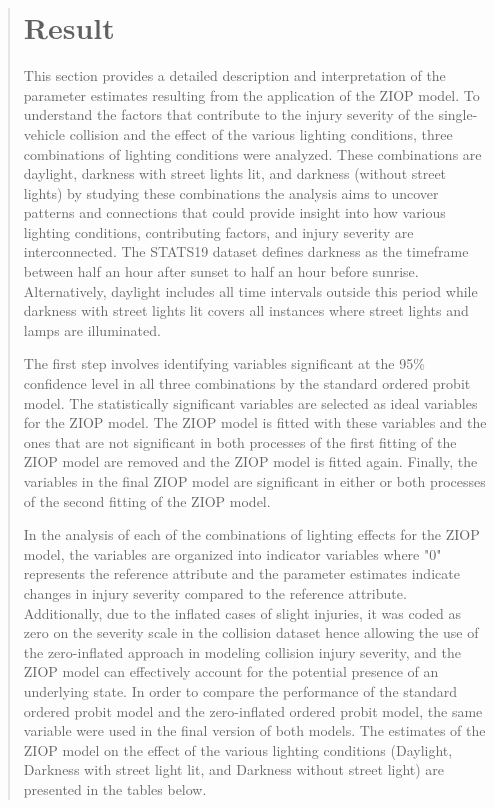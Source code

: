\documentclass[12]{report}
\begin{document}
\begin{quote}
{\large
\chapter{Result}

This section provides a detailed description and interpretation of the parameter estimates resulting from the application of the ZIOP model. To understand the factors that contribute to the injury severity of the single-vehicle collision and the effect of the various lighting conditions, three combinations of lighting conditions were analyzed. These combinations are daylight, darkness with street lights lit, and darkness (without street lights) by studying these combinations the analysis aims to uncover patterns and connections that could provide insight into how various lighting conditions, contributing factors, and injury severity are interconnected.  The STATS19 dataset defines darkness as the timeframe between  half an hour after sunset to half an hour before sunrise. Alternatively, daylight includes all time intervals outside this period while darkness with street lights lit covers all instances where street lights and lamps are illuminated.

The first step involves identifying variables significant at the 95\% confidence level in all three combinations by the standard ordered probit model. The statistically significant variables are selected as ideal variables for the ZIOP model. The ZIOP model is fitted with these variables and the ones that are not significant in both processes of the first fitting of the ZIOP model are removed and the ZIOP model is fitted again. Finally, the variables in the final ZIOP model are significant in either or both processes of the second fitting of the ZIOP model.

In the analysis of each of the combinations of lighting effects for the ZIOP model, the variables are organized into indicator variables where "0" represents the reference attribute and the parameter estimates indicate changes in injury severity compared to the reference attribute. Additionally, due to the inflated cases of slight injuries, it was coded as zero on the severity scale in the collision dataset hence allowing the use of the zero-inflated approach in modeling collision injury severity, and the ZIOP model can effectively account for the potential presence of an underlying state. In order to compare the performance of the standard ordered probit model and the zero-inflated ordered probit model, the same variable were used in the final version of both models. The estimates of the ZIOP model on the effect of the various lighting conditions (Daylight, Darkness with street light lit, and Darkness without street light) are presented in the tables below.

}
\end{quote}
\end{document}
